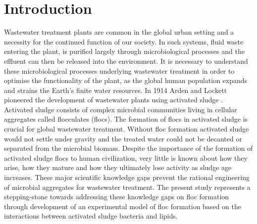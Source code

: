 \documentclass[twoside]{article}
\begin{document}
\section{Introduction}
\thispagestyle{plain}
Wastewater treatment plants are common in the global urban setting and a necessity for the continued function of our society. In such systems, fluid waste entering the plant, is purified largely through microbiological processes and the effluent can then be released into the environment. It is necessary to understand these microbiological processes underlying wastewater treatment in order to optimise the functionality of the plant, as the global human population expands and strains the Earth's finite water resources. In 1914 Arden and Lockett pioneered the development of wastewater plants using activated sludge \cite{ardern1914experiments}.\\

Activated sludge consists of complex microbial communities living in cellular aggregates called flocculates (flocs). The formation of flocs in activated sludge is crucial for global wastewater treatment. Without floc formation activated sludge would not settle under gravity and the treated water could not be decanted or separated from the microbial biomass. Despite the importance of the formation of activated sludge flocs to human civilization, very little is known about how they arise, how they mature and how they ultimately lose activity as sludge age increases. These major scientific knowledge gaps prevent the rational engineering of microbial aggregates for wastewater treatment. The present study represents a stepping-stone towards addressing these knowledge gaps on floc formation through development of an experimental model of floc formation based on the interactions between activated sludge bacteria and lipids. \\

\end{document}
